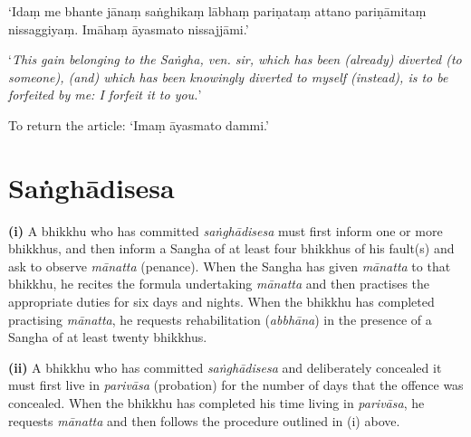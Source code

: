‘Idaṃ me bhante jānaṃ saṅghikaṃ lābhaṃ pariṇataṃ attano pariṇāmitaṃ nissaggiyaṃ.
Imāhaṃ āyasmato nissajjāmi.’

‘\emph{This gain belonging to the Saṅgha, ven. sir, which has been (already)
  diverted (to someone), (and) which has been knowingly diverted to myself
  (instead), is to be forfeited by me: I forfeit it to you.}’


To return the article: ‘Imaṃ āyasmato dammi.’


\ifhandbookedition
\clearpage
\fi

\section{Saṅghādisesa}

\textbf{(i)} A bhikkhu who has committed \emph{saṅghādisesa} must first inform
one or more bhikkhus, and then inform a Sangha of at least four bhikkhus of his
fault(s) and ask to observe \emph{mānatta} (penance). When the Sangha has given
\emph{mānatta} to that bhikkhu, he recites the formula undertaking
\emph{mānatta} and then practises the appropriate duties for six days and
nights. When the bhikkhu has completed practising \emph{mānatta}, he requests
rehabilitation (\emph{abbhāna}) in the presence of a Sangha of at least twenty
bhikkhus.

\textbf{(ii)} A bhikkhu who has committed \emph{saṅghādisesa} and deliberately
concealed it must first live in \emph{parivāsa} (probation) for the number of
days that the offence was concealed. When the bhikkhu has completed his time
living in \emph{parivāsa}, he requests \emph{mānatta} and then follows the
procedure outlined in (i) above.


